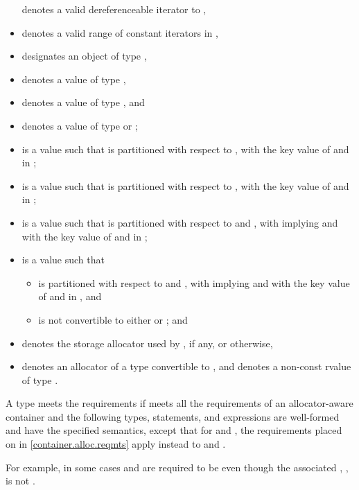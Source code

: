 \begin{itemize}
 denotes a valid dereferenceable iterator to ,
\item
\tcode{[q1, q2)} denotes a valid range of constant iterators in ,
\item
{} designates an object of type ,
\item
{} denotes a value of type ,
\item
{} denotes a value of type , and
\item
{} denotes a value of type  or ;
\item
{} is a value such that  is partitioned
with respect to ,
with  the key value of  and  in ;
\item
{} is a value such that  is partitioned with respect to
,
with  the key value of  and  in ;
\item
{} is a value such that  is partitioned with respect to
 and , with  implying
 and
with  the key value of  and  in ;
\item
{} is a value such that
\begin{itemize}
\item
{} is partitioned with respect to  and ,
with  implying  and
with  the key value of  and  in , and
\item
{} is not convertible to
either  or ; and
\end{itemize}
\item
{} denotes the storage allocator used by , if any, or  otherwise,
\item
{} denotes an allocator of a type convertible to ,
and  denotes a non-const rvalue of type .
\end{itemize}

\pnum
A type  meets the  requirements
if  meets all the requirements of an allocator-aware
container and
the following types, statements, and expressions are well-formed and
have the specified semantics,
except that for
 and , the requirements placed on 
in \ref{container.alloc.reqmts} apply instead to 
and .
\begin{note}
For example, in some cases  and 
are required to be  even though the associated
, , is not
.
\end{note}

